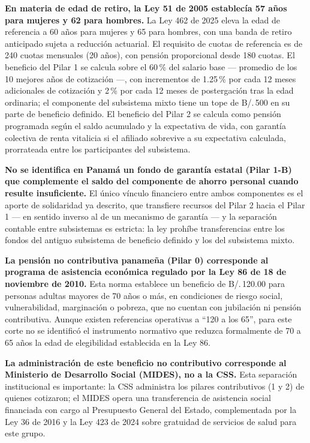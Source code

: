 \documentclass[12pt, letterpaper]{article}
\begin{document}
\textbf{En materia de edad de retiro, la Ley 51 de 2005 establecía 57 años para mujeres y 62 para hombres.} La Ley 462 de 2025 eleva la edad de referencia a 60 años para mujeres y 65 para hombres, con una banda de retiro anticipado sujeta a reducción actuarial. El requisito de cuotas de referencia es de 240 cuotas mensuales (20 años), con pensión proporcional desde 180 cuotas. El beneficio del Pilar 1 se calcula sobre el 60\,\% del salario base --- promedio de los 10 mejores años de cotización ---, con incrementos de 1.25\,\% por cada 12 meses adicionales de cotización y 2\,\% por cada 12 meses de postergación tras la edad ordinaria; el componente del subsistema mixto tiene un tope de B/.\,500 en su parte de beneficio definido. El beneficio del Pilar 2 se calcula como pensión programada según el saldo acumulado y la expectativa de vida, con garantía colectiva de renta vitalicia si el afiliado sobrevive a su expectativa calculada, prorrateada entre los participantes del subsistema.

\textbf{No se identifica en Panamá un fondo de garantía estatal (Pilar 1-B) que complemente el saldo del componente de ahorro personal cuando resulte insuficiente.} El único vínculo financiero entre ambos componentes es el aporte de solidaridad ya descrito, que transfiere recursos del Pilar 2 hacia el Pilar 1 --- en sentido inverso al de un mecanismo de garantía --- y la separación contable entre subsistemas es estricta: la ley prohíbe transferencias entre los fondos del antiguo subsistema de beneficio definido y los del subsistema mixto.

\textbf{La pensión no contributiva panameña (Pilar 0) corresponde al programa de asistencia económica regulado por la Ley 86 de 18 de noviembre de 2010.} Esta norma establece un beneficio de B/.\,120.00 para personas adultas mayores de 70 años o más, en condiciones de riesgo social, vulnerabilidad, marginación o pobreza, que no cuentan con jubilación ni pensión contributiva. Aunque existen referencias operativas a ``120 a los 65'', para este corte no se identificó el instrumento normativo que reduzca formalmente de 70 a 65 años la edad de elegibilidad establecida en la Ley 86.

\textbf{La administración de este beneficio no contributivo corresponde al Ministerio de Desarrollo Social (MIDES), no a la CSS.} Esta separación institucional es importante: la CSS administra los pilares contributivos (1 y 2) de quienes cotizaron; el MIDES opera una transferencia de asistencia social financiada con cargo al Presupuesto General del Estado, complementada por la Ley 36 de 2016 y la Ley 423 de 2024 sobre gratuidad de servicios de salud para este grupo.
\end{document}
